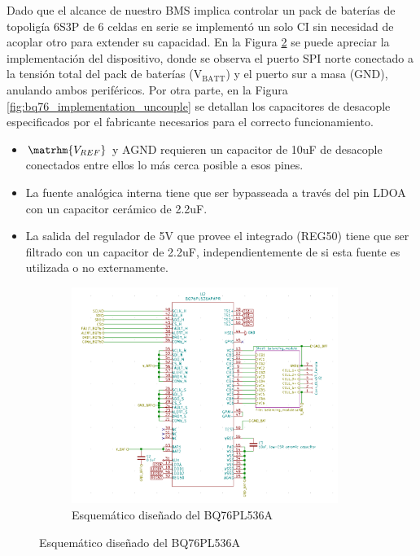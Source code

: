 \documentclass[10pt,a4paper]{article}
\begin{document}
\begin{itemize}
Dado que el alcance de nuestro \acrshort{BMS} implica controlar un pack de
bater\'ias de topoligía 6S3P de 6 celdas en serie se implementó un solo
\acrshort{CI} sin necesidad de acoplar otro para extender su capacidad. En la
Figura \ref{fig:bq76_implementation_sch} se puede apreciar la implementaci\'on
del dispositivo, donde se observa el puerto SPI norte conectado a la tensi\'on
total del pack de bater\'ias ($\mathrm{V_{BATT}}$) y el puerto sur a masa
($\mathrm{GND}$), anulando ambos perif\'ericos. Por otra parte, en la Figura
\ref{fig:bq76_implementation_uncouple} se detallan los capacitores de desacople
especificados por el fabricante \cite{BQ76PL536A} necesarios para el correcto
funcionamiento.

\begin{itemize}
    \item $\matrhm{V_{REF}}$ y AGND requieren un capacitor de 10uF de
        desacople conectados entre ellos lo m\'as cerca posible a esos pines.
    \item La fuente anal\'ogica interna tiene que ser bypasseada a trav\'es del
        pin LDOA con un capacitor cer\'amico de 2.2uF.
    \item La salida del regulador de 5V que provee el integrado (REG50) tiene 
        que ser filtrado con un capacitor de 2.2uF, independientemente de si 
        esta fuente es utilizada o no externamente.
\end{itemize}

\begin{figure}[!h]
    \begin{subfigure}[b]{\textwidth}
        \begin{center}
            \includegraphics[width=0.95\textwidth]{bq76_implementation.png}
            \caption{Esquem\'atico diseñado del BQ76PL536A}
            \label{fig:bq76_implementation_sch}
        \end{center}
    \end{subfigure}


\end{figure}
\end{itemize}
\end{document}
